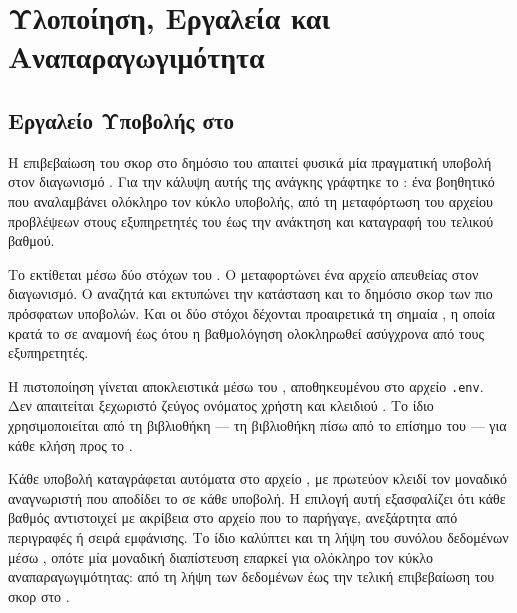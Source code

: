 

\chapter{Υλοποίηση, Εργαλεία και Αναπαραγωγιμότητα}
\label{ch:b}


\section{Εργαλείο Υποβολής στο }
\label{sec:kaggle-submit}

Η επιβεβαίωση του σκορ  \texttt{\KaggleBaselinePublic{}} στο δημόσιο  του  απαιτεί φυσικά μία πραγματική υποβολή στον διαγωνισμό .
Για την κάλυψη αυτής της ανάγκης γράφτηκε το \texttt{}: ένα βοηθητικό  που αναλαμβάνει ολόκληρο τον κύκλο υποβολής, από τη μεταφόρτωση του αρχείου προβλέψεων στους εξυπηρετητές του  έως την ανάκτηση και καταγραφή του τελικού βαθμού.

Το  εκτίθεται μέσω δύο στόχων του \texttt{}.
Ο \texttt{} μεταφορτώνει ένα αρχείο  απευθείας στον διαγωνισμό.
Ο \texttt{} αναζητά και εκτυπώνει την κατάσταση και το δημόσιο σκορ των πιο πρόσφατων υποβολών.
Και οι δύο στόχοι δέχονται προαιρετικά τη σημαία \texttt{}, η οποία κρατά το  σε αναμονή έως ότου η βαθμολόγηση ολοκληρωθεί ασύγχρονα από τους εξυπηρετητές.

Η πιστοποίηση γίνεται αποκλειστικά μέσω του  \texttt{}, αποθηκευμένου στο αρχείο \texttt{.env}.
Δεν απαιτείται ξεχωριστό ζεύγος ονόματος χρήστη και κλειδιού .
Το ίδιο  χρησιμοποιείται από τη βιβλιοθήκη \texttt{} --- τη βιβλιοθήκη πίσω από το επίσημο  του  --- για κάθε κλήση προς το .

Κάθε υποβολή καταγράφεται αυτόματα στο αρχείο \texttt{}, με πρωτεύον κλειδί τον μοναδικό αναγνωριστή \texttt{} που αποδίδει το  σε κάθε υποβολή.
Η επιλογή αυτή εξασφαλίζει ότι κάθε βαθμός αντιστοιχεί με ακρίβεια στο αρχείο που το παρήγαγε, ανεξάρτητα από περιγραφές ή σειρά εμφάνισης.
Το ίδιο  καλύπτει και τη λήψη του συνόλου δεδομένων μέσω \texttt{}, οπότε μία μοναδική διαπίστευση επαρκεί για ολόκληρο τον κύκλο αναπαραγωγιμότητας: από τη λήψη των δεδομένων έως την τελική επιβεβαίωση του σκορ στο .


